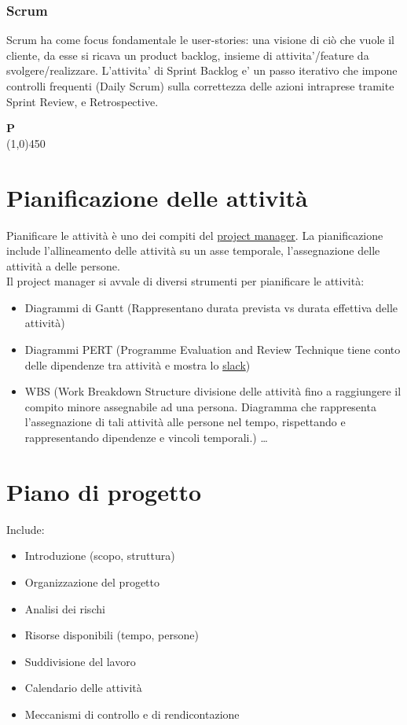 			\subsubsection{Scrum}
				Scrum ha come focus fondamentale le  user-stories: una visione di ciò che vuole il cliente, da esse si ricava un product backlog, insieme di attivita'/feature da svolgere/realizzare. L'attivita' di Sprint Backlog e' un passo iterativo che impone controlli frequenti (Daily Scrum) sulla correttezza delle azioni intraprese tramite Sprint Review, e Retrospective.\newpage

	{\Huge{\textbf{P}}} \\
	\line(1,0){450}
	

	\section{Pianificazione delle attività}	
	\label{sec:pianificazioneattivita}
	Pianificare le attività è uno dei compiti del \hyperref[sec:projectmanager]{project manager}.
	La pianificazione include l'allineamento delle attività su un asse temporale, l'assegnazione delle attività a delle persone. \\Il project manager si avvale di diversi strumenti per pianificare le attività:  	
	\begin{itemize}  
	\item Diagrammi di Gantt (Rappresentano durata prevista vs durata effettiva delle attività)
	\item Diagrammi PERT (Programme Evaluation and Review Technique tiene conto delle dipendenze tra attività e mostra lo \hyperref[sec:slack]{slack})
	\item WBS (Work Breakdown Structure divisione delle attività fino a raggiungere il compito minore assegnabile ad una persona. Diagramma che rappresenta l'assegnazione di tali attività alle persone nel tempo, rispettando e rappresentando dipendenze e vincoli temporali.) \ldots 
	\end{itemize}	
	
	\section{Piano di progetto}	
	\label{sec:pianoprogetto}
	Include:
	\begin{itemize}  
	\item Introduzione (scopo, struttura)
	\item Organizzazione del progetto
	\item Analisi dei rischi
	\item Risorse disponibili (tempo, persone)
	\item Suddivisione del lavoro
	\item Calendario delle attività
	\item Meccanismi di controllo e di rendicontazione	
	\end{itemize}	
		
